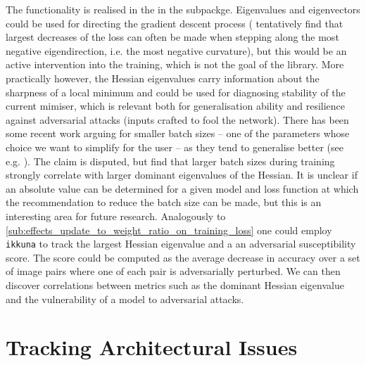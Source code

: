 The functionality is realised in the  in the
 subpackge. Eigenvalues and eigenvectors could
be used for directing the gradient descent process (\citet{alain2018negative}
tentatively find that largest decreases of the loss can often be made when
stepping along the most negative eigendirection, i.e. the most negative
curvature), but this would be an active intervention into the training, which is
not the goal of the library. More practically however, the Hessian eigenvalues
carry information about the sharpness of a local minimum and could be used for
diagnosing stability of the current mimiser, which is relevant both for
generalisation ability and resilience against adversarial attacks (inputs
crafted to fool the network). There has been some recent work arguing for
smaller batch sizes -- one of the parameters whose choice we want to simplify
for the user -- as they tend to generalise better (see e.g.
\citep{keskar2016large}). The claim is disputed, but \citet{yao2018hessian} find
that larger batch sizes during training strongly correlate with larger dominant
eigenvalues of the Hessian. It is unclear if an absolute value can be determined
for a given model and loss function at which the recommendation to reduce the
batch size can be made, but this is an interesting area for future research.
Analogously to \cref{sub:effects_update_to_weight_ratio_on_training_loss} one
could employ \texttt{ikkuna} to track the largest Hessian eigenvalue and a an
adversarial susceptibility score. The score could be computed as the average
decrease in accuracy over a set of image pairs where one of each pair is
adversarially perturbed. We can then discover correlations between metrics such
as the dominant Hessian eigenvalue and the vulnerability of a model to
adversarial attacks.


\section{Tracking Architectural Issues}%
\label{sec:tracking_architecture}


